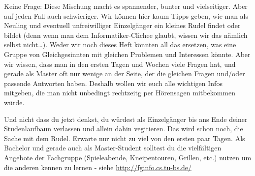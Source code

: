 Keine Frage: Diese Mischung macht es spannender, bunter und vielseitiger. Aber auf jeden Fall auch schwieriger. Wir können hier kaum Tipps geben, wie man als Neuling und eventuell unfreiwilliger Einzelgänger ein kleines Rudel findet oder bildet (denn wenn man dem Informatiker-Clichee glaubt, wissen wir das nämlich selbst nicht\ldots). Weder wir noch dieses Heft könnten all das ersetzen, was eine Gruppe von Gleichgesinnten mit gleichen Problemen und Interessen könnte. Aber wir wissen, dass man in den ersten Tagen und Wochen viele Fragen hat, und gerade als Master oft nur wenige an der Seite, der die gleichen Fragen und/oder passende Antworten haben. Deshalb wollen wir euch alle wichtigen Infos mitgeben, die man nicht unbedingt rechtzeitg per Hörensagen mitbekommen würde.

Und nicht dass du jetzt denkst, du würdest als Einzelgänger bis ans Ende deiner Studenlaufbaun verlassen und allein dahin vegitieren. Das wird schon noch, die Sache mit dem Rudel. Erwarte nur nicht zu viel von den ersten paar Tagen. Als Bachelor und gerade auch als Master-Student solltest du die vielfältigen Angebote der Fachgruppe (Spieleabende, Kneipentouren, Grillen, etc.) nutzen um die anderen kennen zu lernen - siehe \url{http://fginfo.cs.tu-bs.de/}